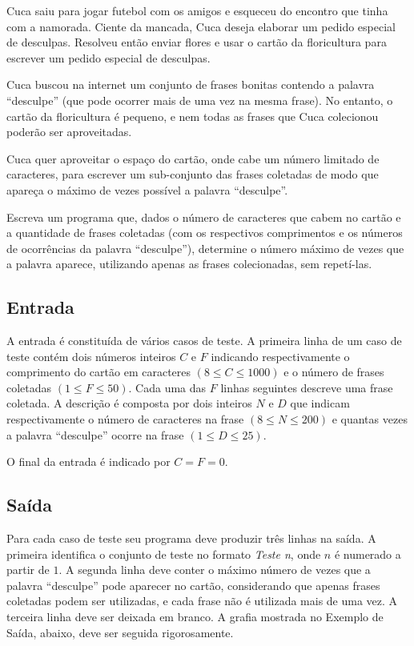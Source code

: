 Cuca saiu para jogar futebol com os amigos e esqueceu do encontro que tinha com
a namorada. Ciente da mancada, Cuca deseja elaborar um pedido especial de
desculpas. Resolveu então enviar flores e usar o cartão da floricultura para
escrever um pedido especial de desculpas.

Cuca buscou na internet um conjunto de frases bonitas contendo a palavra
``desculpe'' (que pode ocorrer mais de uma vez na mesma frase). No entanto, o
cartão da floricultura é pequeno, e nem todas as frases que Cuca colecionou
poderão ser aproveitadas.

Cuca quer aproveitar o espaço do cartão, onde cabe um número limitado de
caracteres, para escrever um sub-conjunto das frases coletadas de modo que
apareça o máximo de vezes possível a palavra ``desculpe''.

Escreva um programa que, dados o número de caracteres que cabem no cartão e a
quantidade de frases coletadas (com os respectivos comprimentos e os números de
ocorrências da palavra ``desculpe''), determine o número máximo de vezes
que a palavra aparece, utilizando apenas as frases colecionadas, sem
repetí-las.


\subsection*{Entrada}

A entrada é constituída de vários casos de teste. A primeira linha de um caso de
teste contém dois números inteiros $C$ e $F$ indicando respectivamente o comprimento
do cartão em caracteres $(8 \leq C \leq 1000)$ e o número de frases coletadas
$(1 \leq F \leq 50)$. Cada uma das $F$ linhas seguintes descreve uma frase coletada. A
descrição é composta por dois inteiros $N$ e $D$ que indicam respectivamente o
número de caracteres na frase $(8 \leq N \leq 200)$ e quantas vezes a palavra
``desculpe'' ocorre na frase $(1 \leq D \leq 25)$.

O final da entrada é indicado por $C = F = 0$.


\subsection*{Saída}

Para cada caso de teste seu programa deve produzir três linhas na saída. A
primeira identifica o conjunto de teste no formato \textit{Teste n}, onde $n$ é numerado
a partir de $1$. A segunda linha deve conter o máximo número de vezes que a
palavra ``desculpe'' pode aparecer no cartão, considerando que apenas frases
coletadas podem ser utilizadas, e cada frase não é utilizada mais de uma vez. A
terceira linha deve ser deixada em branco. A grafia mostrada no Exemplo de
Saída, abaixo, deve ser seguida rigorosamente.

